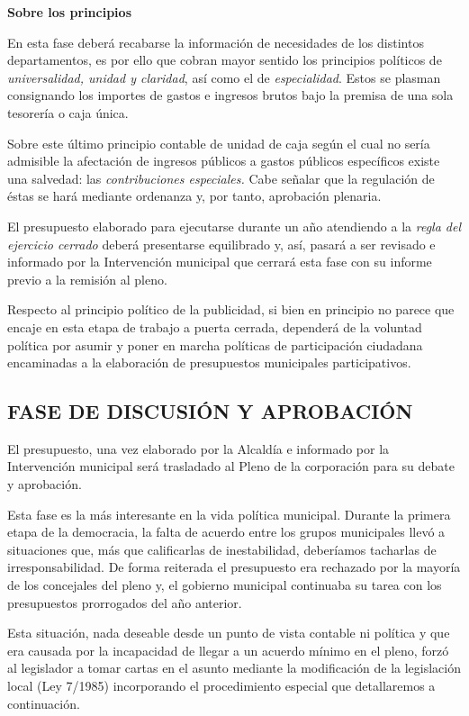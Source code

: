 \documentclass[
]{article}
\begin{document}
\textbf{Sobre los principios}

En esta fase deberá recabarse la información de necesidades de los
distintos departamentos, es por ello que cobran mayor sentido los
principios políticos de \emph{universalidad, unidad y claridad}, así
como el de \emph{especialidad}. Estos se plasman consignando los
importes de gastos e ingresos brutos bajo la premisa de una sola
tesorería o caja única.

Sobre este último principio contable de unidad de caja según el cual no
sería admisible la afectación de ingresos públicos a gastos públicos
específicos existe una salvedad: las \emph{contribuciones especiales.}
Cabe señalar que la regulación de éstas se hará mediante ordenanza y,
por tanto, aprobación plenaria.

El presupuesto elaborado para ejecutarse durante un año atendiendo a la
\emph{regla del ejercicio cerrado} deberá presentarse equilibrado y,
así, pasará a ser revisado e informado por la Intervención municipal que
cerrará esta fase con su informe previo a la remisión al pleno.

Respecto al principio político de la publicidad, si bien en principio no
parece que encaje en esta etapa de trabajo a puerta cerrada, dependerá
de la voluntad política por asumir y poner en marcha políticas de
participación ciudadana encaminadas a la elaboración de presupuestos
municipales participativos.

\hypertarget{fase-de-discusiuxf3n-y-aprobaciuxf3n}{%
\subsection{FASE DE DISCUSIÓN Y
APROBACIÓN}\label{fase-de-discusiuxf3n-y-aprobaciuxf3n}}

El presupuesto, una vez elaborado por la Alcaldía e informado por la
Intervención municipal será trasladado al Pleno de la corporación para
su debate y aprobación.

Esta fase es la más interesante en la vida política municipal. Durante
la primera etapa de la democracia, la falta de acuerdo entre los grupos
municipales llevó a situaciones que, más que calificarlas de
inestabilidad, deberíamos tacharlas de irresponsabilidad. De forma
reiterada el presupuesto era rechazado por la mayoría de los concejales
del pleno y, el gobierno municipal continuaba su tarea con los
presupuestos prorrogados del año anterior.

Esta situación, nada deseable desde un punto de vista contable ni
política y que era causada por la incapacidad de llegar a un acuerdo
mínimo en el pleno, forzó al legislador a tomar cartas en el asunto
mediante la modificación de la legislación local (Ley 7/1985)
incorporando el procedimiento especial que detallaremos a continuación.
\end{document}
